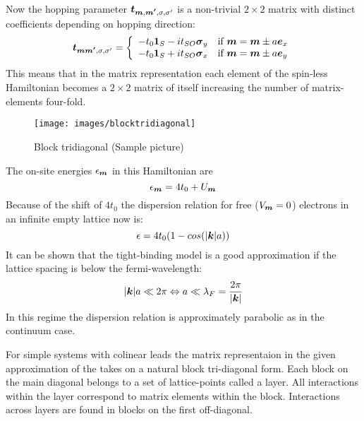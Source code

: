 Now the hopping parameter $\boldsymbol{t}_{\boldsymbol{m},\boldsymbol{m'},\sigma,\sigma '}$ is a non-trivial $2 \times 2$ matrix with distinct coefficients depending on hopping direction:
\begin{align}
	\boldsymbol{t}_{\boldsymbol{m}\boldsymbol{m'},\sigma,\sigma '} = \left\{ \begin{array}[c]{cl} -t_0\boldsymbol{1}_S - i t_{SO} \boldsymbol{\sigma}_y & \text{if } \boldsymbol{m} = \boldsymbol{m} \pm a \boldsymbol{e}_{x} \\
		-t_0\boldsymbol{1}_S + i t_{SO} \boldsymbol{\sigma}_x & \text{if } \boldsymbol{m} = \boldsymbol{m} \pm a \boldsymbol{e}_{y} \end{array} \right.
	\label{eqn:tsohopping}
\end{align}
This means that in the matrix representation each element of the spin-less Hamiltonian becomes a $2 \times 2$ matrix of itself increasing the number of matrix-elements four-fold.
\begin{figure}[h!]
\centering
\texttt{[image: images/blocktridiagonal]}
\caption{Block tridiagonal (Sample picture)}
\label{fig:blocktridiagonal}
\end{figure}
The on-site energies $\epsilon_{\boldsymbol{m}}$ in this Hamiltonian are
\begin{equation}
\epsilon_{\boldsymbol{m}} = 4t_0 + U_{\boldsymbol{m}} 
\end{equation}
Because of the shift of $4 t_0$ the dispersion relation for free ($V_{\boldsymbol{m}}=0$) electrons in an infinite empty lattice now is:
\begin{equation}
\epsilon = 4t_0(1-cos(\lvert\boldsymbol{k}\rvert a))
\end{equation}
It can be shown that the tight-binding model is a good approximation if the lattice spacing is below the fermi-wavelength:
\begin{equation}
\lvert\boldsymbol{k}\rvert a \ll  2\pi \Leftrightarrow a \ll \lambda_F = \frac{2\pi}{\lvert\boldsymbol{k}\rvert}
\end{equation}
In this regime the dispersion relation is approximately parabolic as in the continuum case.\cite{Metalidis2007Thesis}

For simple systems with colinear leads the matrix representaion in the given approximation of the \hamil{} takes on a natural block tri-diagonal form. Each block on the main diagonal belongs to a set of lattice-points called a layer. All interactions within the layer correspond to matrix elements within the block. Interactions across layers are found in blocks on the first off-diagonal\cite{AnLunNik2008}.
